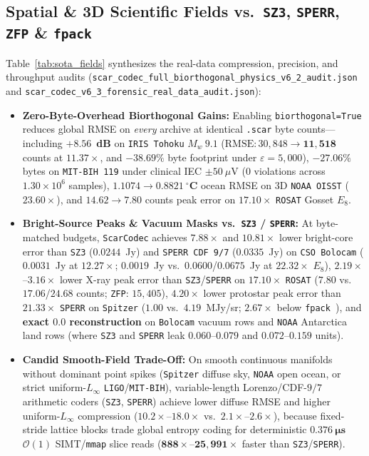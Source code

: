 \documentclass[10pt,twocolumn]{article}
\begin{document}
\subsection{Spatial \& 3D Scientific Fields vs.\ \texttt{SZ3}, \texttt{SPERR}, \texttt{ZFP} \& \texttt{fpack}}
Table~\ref{tab:sota_fields} synthesizes the real-data compression, precision, and throughput audits (\texttt{scar\_codec\_full\_biorthogonal\_physics\_v6\_2\_audit.json} and \texttt{scar\_codec\_v6\_3\_forensic\_real\_data\_audit.json}):
\begin{itemize}
    \item \textbf{Zero-Byte-Overhead Biorthogonal Gains:} Enabling \texttt{biorthogonal=True} reduces global RMSE on \emph{every} archive at identical \texttt{.scar} byte counts---including $\mathbf{+8.56}$~\textbf{dB} on \texttt{IRIS Tohoku} $M_w~9.1$ ($\text{RMSE}: 30{,}848 \to \mathbf{11{,}518}$ counts at $11.37\times$, and $\mathbf{-38.69\%}$ byte footprint under $\varepsilon=5{,}000$), $\mathbf{-27.06\%}$ bytes on \texttt{MIT-BIH 119} under clinical IEC $\pm 50~\mu$V ($0$ violations across $1.30\times 10^6$ samples), $\mathbf{1.1074 \to 0.8821~^\circ\textbf{C}}$ ocean RMSE on 3D \texttt{NOAA OISST} ($23.60\times$), and $14.62 \to \mathbf{7.80}$ counts peak error on $17.10\times$ \texttt{ROSAT} Gosset $E_8$.
    \item \textbf{Bright-Source Peaks \& Vacuum Masks vs.\ \texttt{SZ3} / \texttt{SPERR}:} At byte-matched budgets, \texttt{ScarCodec} achieves $\mathbf{7.88\times}$ and $\mathbf{10.81\times}$ lower bright-core error than \texttt{SZ3} ($0.0244$~Jy) and \texttt{SPERR CDF 9/7} ($0.0335$~Jy) on \texttt{CSO Bolocam} ($0.0031$~Jy at $12.27\times$; $0.0019$~Jy vs.\ $0.0600$/$0.0675$~Jy at $22.32\times$ $E_8$), $\mathbf{2.19\times}$--$\mathbf{3.16\times}$ lower X-ray peak error than \texttt{SZ3}/\texttt{SPERR} on $17.10\times$ \texttt{ROSAT} ($7.80$ vs.\ $17.06$/$24.68$ counts; \texttt{ZFP}: $15{,}405$), $\mathbf{4.20\times}$ lower protostar peak error than $21.33\times$ \texttt{SPERR} on \texttt{Spitzer} ($1.00$ vs.\ $4.19$~MJy/sr; $2.67\times$ below \texttt{fpack}~\citep{pence2009fpack}), and \textbf{exact $0.0$ reconstruction} on \texttt{Bolocam} vacuum rows and \texttt{NOAA} Antarctica land rows (where \texttt{SZ3} and \texttt{SPERR} leak $0.060$--$0.079$ and $0.072$--$0.159$ units).
    \item \textbf{Candid Smooth-Field Trade-Off:} On smooth continuous manifolds without dominant point spikes (\texttt{Spitzer} diffuse sky, \texttt{NOAA} open ocean, or strict uniform-$L_\infty$ \texttt{LIGO}/\texttt{MIT-BIH}), variable-length Lorenzo/CDF-$9/7$ arithmetic coders (\texttt{SZ3}, \texttt{SPERR}) achieve lower diffuse RMSE and higher uniform-$L_\infty$ compression ($10.2\times$--$18.0\times$ vs.\ $2.1\times$--$2.6\times$), because fixed-stride lattice blocks trade global entropy coding for deterministic $\mathbf{0.376~\mu\textbf{s}}$ $\mathcal{O}(1)$ SIMT/\texttt{mmap} slice reads ($\mathbf{888\times}$--$\mathbf{25{,}991\times}$ faster than \texttt{SZ3}/\texttt{SPERR}).
\end{itemize}
\end{document}
